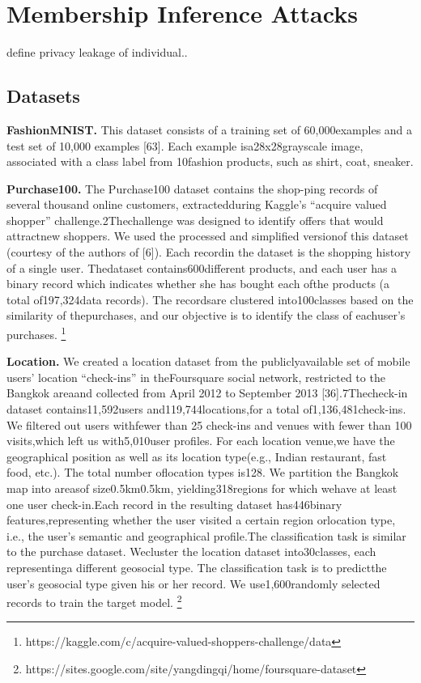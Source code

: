 \section{Membership Inference Attacks}\label{inferenceback}

define privacy leakage of individual..

\subsection{Datasets}

\noindent\textbf{FashionMNIST.} This dataset consists of a training set of 60,000examples and a test set of 10,000 examples [63]. Each example isa28x28grayscale image, associated with a class label from 10fashion products, such as shirt, coat, sneaker.

\noindent\textbf{Purchase100.} The  Purchase100  dataset  contains  the  shop-ping  records  of  several  thousand  online  customers,  extractedduring  Kaggle’s  “acquire  valued  shopper”  challenge.2Thechallenge  was  designed  to  identify  offers  that  would  attractnew  shoppers.  We  used  the  processed  and  simplified  versionof  this  dataset  (courtesy  of  the  authors  of  [6]).  Each  recordin  the  dataset  is  the  shopping  history  of  a  single  user.  Thedataset  contains600different  products, and each user has a binary record which indicates whether she has bought each ofthe  products  (a  total  of197,324data  records).  The  recordsare  clustered  into100classes  based  on  the  similarity  of  thepurchases,  and  our  objective  is  to  identify  the  class  of  eachuser’s purchases.
\footnote{https://kaggle.com/c/acquire-valued-shoppers-challenge/data}

\noindent\textbf{Location.} We created a location dataset from the publiclyavailable set of mobile users’ location “check-ins” in theFoursquare social network, restricted to the Bangkok areaand collected from April 2012 to September 2013 [36].7Thecheck-in dataset contains11,592users and119,744locations,for a total of1,136,481check-ins. We filtered out users withfewer than 25 check-ins and venues with fewer than 100 visits,which left us with5,010user profiles. For each location venue,we have the geographical position as well as its location type(e.g., Indian restaurant, fast food, etc.). The total number oflocation types is128. We partition the Bangkok map into areasof size0.5km0.5km, yielding318regions for which wehave at least one user check-in.Each record in the resulting dataset has446binary features,representing whether the user visited a certain region orlocation type, i.e., the user’s semantic and geographical profile.The classification task is similar to the purchase dataset. Wecluster the location dataset into30classes, each representinga different geosocial type. The classification task is to predictthe user’s geosocial type given his or her record. We use1,600randomly selected records to train the target model. \footnote{https://sites.google.com/site/yangdingqi/home/foursquare-dataset}

